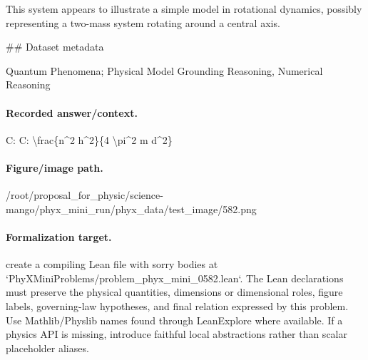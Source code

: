 This system appears to illustrate a simple model in rotational dynamics, possibly representing a two-mass system rotating around a central axis.

\#\# Dataset metadata

Quantum Phenomena; Physical Model Grounding Reasoning, Numerical Reasoning

\paragraph{Recorded answer/context.}
C: C: \textbackslash{}frac\{n\textasciicircum{}2 h\textasciicircum{}2\}\{4 \textbackslash{}pi\textasciicircum{}2 m d\textasciicircum{}2\}

\paragraph{Figure/image path.}
/root/proposal\_for\_physic/science-mango/phyx\_mini\_run/phyx\_data/test\_image/582.png

\paragraph{Formalization target.}
create a compiling Lean file with sorry bodies at `PhyXMiniProblems/problem\_phyx\_mini\_0582.lean`. The Lean declarations must preserve the physical quantities, dimensions or dimensional roles, figure labels, governing-law hypotheses, and final relation expressed by this problem.
Use Mathlib/Physlib names found through LeanExplore where available. If a physics API is missing, introduce faithful local abstractions rather than scalar placeholder aliases.

